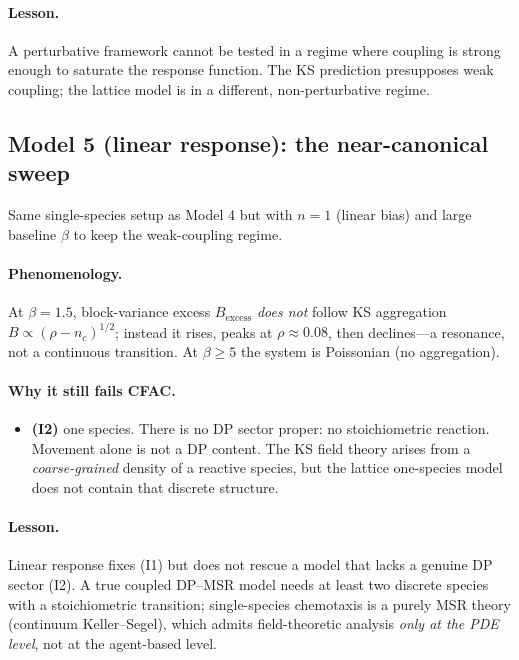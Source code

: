 \documentclass[10pt,a4paper,twocolumn]{article}
\theoremstyle{definition}
\begin{document}
\paragraph{Lesson.}
A perturbative framework cannot be tested in a regime where
coupling is strong enough to saturate the response function.
The KS prediction presupposes weak coupling; the lattice model
is in a different, non-perturbative regime.

\subsection{Model 5 (linear response): the near-canonical sweep}
Same single-species setup as Model 4 but with $n = 1$ (linear
bias) and large baseline $\beta$ to keep the weak-coupling regime.

\paragraph{Phenomenology.}
At $\beta = 1.5$, block-variance excess $B_{\text{excess}}$
\emph{does not} follow KS aggregation $B \propto (\rho-n_c)^{1/2}$;
instead it rises, peaks at $\rho\approx 0.08$, then declines---a
resonance, not a continuous transition.  At $\beta \geq 5$
the system is Poissonian (no aggregation).

\paragraph{Why it still fails CFAC.}
\begin{itemize}
  \item \textbf{(I2)} one species.  There is no DP sector proper:
    no stoichiometric reaction.  Movement alone is not a DP
    content.  The KS field theory arises from a
    \emph{coarse-grained} density of a reactive species, but the
    lattice one-species model does not contain that discrete
    structure.
\end{itemize}

\paragraph{Lesson.}
Linear response fixes (I1) but does not rescue a model that
lacks a genuine DP sector (I2).  A true coupled DP--MSR model
needs at least two discrete species with a stoichiometric
transition; single-species chemotaxis is a purely MSR theory
(continuum Keller--Segel), which admits field-theoretic analysis
\emph{only at the PDE level}, not at the agent-based level.
\end{document}
